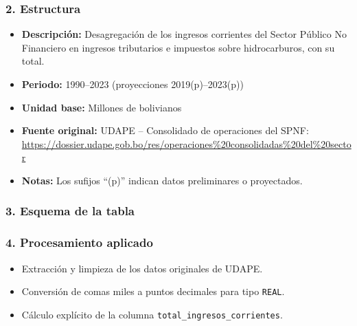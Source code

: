 \documentclass[12pt,a4paper]{article}
\begin{document}
\subsubsection*{2. Estructura}
\begin{itemize}
  \item \textbf{Descripción:} Desagregación de los ingresos corrientes del Sector Público No Financiero en ingresos tributarios e impuestos sobre hidrocarburos, con su total.
  \item \textbf{Periodo:} 1990–2023 (proyecciones 2019(p)–2023(p))
  \item \textbf{Unidad base:} Millones de bolivianos
  \item \textbf{Fuente original:} UDAPE – Consolidado de operaciones del SPNF:\\
    \url{https://dossier.udape.gob.bo/res/operaciones%20consolidadas%20del%20sector}
  \item \textbf{Notas:} Los sufijos “(p)” indican datos preliminares o proyectados.
\end{itemize}

\subsubsection*{3. Esquema de la tabla}

\subsubsection*{4. Procesamiento aplicado}
\begin{itemize}
  \item Extracción y limpieza de los datos originales de UDAPE.
  \item Conversión de comas miles a puntos decimales para tipo \texttt{REAL}.
  \item Cálculo explícito de la columna \texttt{total\_ingresos\_corrientes}.
\end{itemize}
\end{document}
